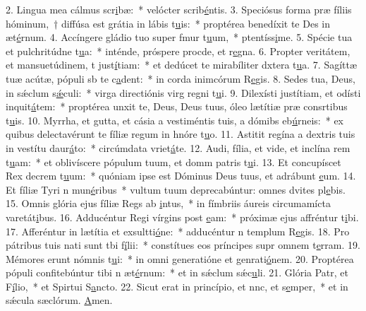2. Lingua mea cálmus scr\uline{i}bæ:~* velócter scrib\uline{é}ntis.
3. Speciósus forma præ fíliis hóminum,~† diffúsa est grátia in lábis t\uline{u}is:~* proptérea benedíxit te Des in æt\uline{é}rnum.
4. Accíngere gládio tuo super fmur t\uline{u}um,~* ptentíss\uline{i}me.
5. Spécie tua et pulchritúdne t\uline{u}a:~* inténde, próspere procde, et r\uline{e}gna.
6. Propter veritátem, et mansuetúdinem, t just\uline{í}tiam:~* et dedúcet te mirabíliter dxtera t\uline{u}a.
7. Sagíttæ tuæ acútæ, pópuli sb te c\uline{a}dent:~* in corda inimcórum R\uline{e}gis.
8. Sedes tua, Deus, in sǽclum s\uline{ǽ}culi:~* virga directiónis virg regni t\uline{u}i.
9. Dilexísti justítiam, et odísti inquit\uline{á}tem:~* proptérea unxit te, Deus, Deus tuus, óleo lætítiæ præ consrtibus t\uline{u}is.
10. Myrrha, et gutta, et cásia a vestiméntis tuis, a dómibs eb\uline{ú}rneis:~* ex quibus delectavérunt te fíliæ regum in hnóre t\uline{u}o.
11. Astitit regína a dextris tuis in vestítu daur\uline{á}to:~* circúmdata vriet\uline{á}te.
12. Audi, fília, et vide, et inclína rem t\uline{u}am:~* et oblivíscere pópulum tuum, et domm patris t\uline{u}i.
13. Et concupíscet Rex decrem t\uline{u}um:~* quóniam ipse est Dóminus Deus tuus, et adrábunt \uline{e}um.
14. Et fíliæ Tyri n mun\uline{é}ribus~* vultum tuum deprecabúntur: omnes dvites pl\uline{e}bis.
15. Omnis glória ejus fíliæ Regs ab \uline{i}ntus,~* in fímbriis áureis circumamícta varetát\uline{i}bus.
16. Adducéntur Regi vírgins post \uline{e}am:~* próximæ ejus affréntur t\uline{i}bi.
17. Afferéntur in lætítia et exsultti\uline{ó}ne:~* adducéntur n templum R\uline{e}gis.
18. Pro pátribus tuis nati sunt tbi f\uline{í}lii:~* constítues eos príncipes supr omnem t\uline{e}rram.
19. Mémores erunt nómnis t\uline{u}i:~* in omni generatióne et genrati\uline{ó}nem.
20. Proptérea pópuli confitebúntur tibi n æt\uline{é}rnum:~* et in sǽclum sǽc\uline{u}li.
21. Glória Patr, et F\uline{í}lio,~* et Spirtui S\uline{a}ncto.
22. Sicut erat in princípio, et nnc, et s\uline{e}mper,~* et in sǽcula sæclórum. \uline{A}men.
